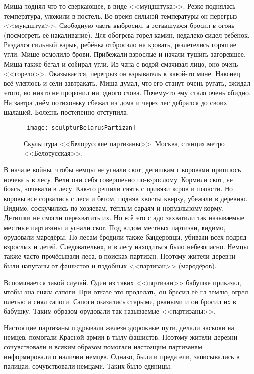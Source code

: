 Миша поднял что-то сверкающее, в виде <<мундштука>>. Резко поднялась температура, уложили в постель. Во время сильной температуры он перегрыз <<мундштук>>. Свободную часть выбросил, а оставшуюся бросил в огонь (посмотреть её накаливание). Для обогрева горел камин, недалеко сидел ребёнок. Раздался сильный взрыв, ребёнка отбросило на кровать, разлетелись горящие угли. Мише осмолило брови. Прибежали взрослые и начали тушить загоревшее. Миша также бегал и собирал угли. Из чана с водой смачивал лицо, оно очень <<горело>>. Оказывается, перегрыз он взрыватель к какой-то мине. Наконец всё улеглось и сели завтракать. Миша думал, что его станут очень ругать, ожидал этого, но никто не проронил ни одного слова. Почему-то ему стало очень обидно. На завтра днём потихоньку сбежал из дома и через лес добрался до своих шалашей. Болезнь постепенно отступила. 

\begin{wrapfigure}{O}{.4\textwidth}
\centering
\texttt{[image: sculpturBelarusPartizan]}
\caption{Скульптура <<Белорусские партизаны>>, Москва, станция метро <<Белорусская>>.}
\label{fig:sculpturBelarusPartizan}
\end{wrapfigure}

В начале войны, чтобы немцы не угнали скот, детишкам с коровами пришлось ночевать в лесу. Вели они себя совершенно по-взрослому. Кормили скот, не боясь, ночевали в лесу. Как-то решили снять с привязи коров и попасти. Но коровы все сорвались с леса и бегом, подняв хвосты кверху, убежали в деревню. Видимо, соскучились по хозяевам, тёплым сараям и нормальному корму. Детишки не смогли перехватить их. Но всё это стадо захватили так называемые местные партизаны и угнали скот. Под видом местных партизан, видимо, орудовали мародёры. По лесам бродили также бандеровцы, убивали всех подряд взрослых и детей. Следовательно, и в лесу находиться было небезопасно. Немцы также часто прочёсывали леса, в поисках партизан. Поэтому жители деревни были напуганы от фашистов и подобных <<партизан>> (мародёров). 

Вспоминается такой случай. Один из таких <<партизан>> бабушке приказал, чтобы она сняла сапоги. При отказе это проделать, он бросил её на землю, огрел плетью и снял сапоги. Сапоги оказались старыми, рваными и он бросил их в бабушку. Таким образом орудовали так называемые <<партизаны>>.

Настоящие партизаны подрывали железнодорожные пути, делали наскоки на немцев, помогали Красной армии в тылу фашистов. Поэтому жители деревни сочувствовали и всяким образом помогали настоящим партизанам, информировали о наличии немцев. Однако, были и предатели, записывались в палицаи, сочувствовали немцами. Таких было единицы. 

